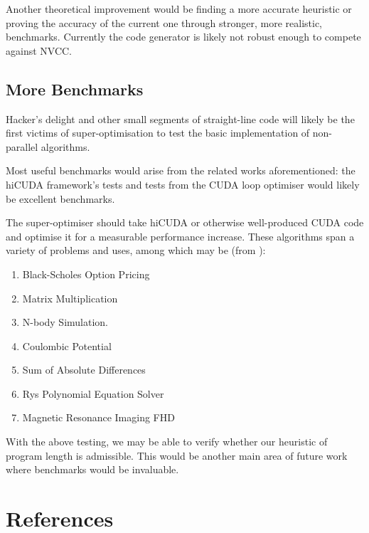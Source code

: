 \documentclass[letterpaper,twocolumn,10pt]{article}
\begin{document}
Another theoretical improvement would be finding a
more accurate heuristic or proving the accuracy
of the current one through stronger, more realistic,
benchmarks. Currently the code generator is likely
not robust enough to compete against NVCC.

\subsection{More Benchmarks}

Hacker's delight and other small segments of
straight-line code will likely be the first
victims of super-optimisation to test the
basic implementation of non-parallel algorithms.

Most useful benchmarks would arise from the related works aforementioned:
the hiCUDA \cite{hicuda} framework's tests and tests
from the CUDA loop optimiser \cite{CUDASynth} would likely
be excellent benchmarks.

The super-optimiser should take hiCUDA or otherwise
well-produced CUDA code and optimise it for
a measurable performance increase.
These algorithms span a variety of problems and uses,
among which may be (from \cite{hicuda}):
\begin{enumerate}
    \item Black-Scholes Option Pricing
    \item Matrix Multiplication
    \item N-body Simulation.
    \item Coulombic Potential
    \item Sum of Absolute Differences
    \item Rys Polynomial Equation Solver
    \item Magnetic Resonance Imaging FHD
\end{enumerate}

With the above testing, we may be able to verify whether our heuristic of program
length is admissible. This would be another main area of future work where
benchmarks would be invaluable.

\section{References}


\end{document}
